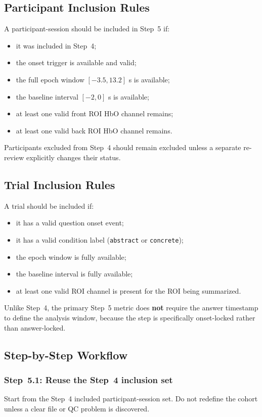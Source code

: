 \subsection{Participant Inclusion Rules}
A participant-session should be included in Step~5 if:
\begin{itemize}
    \item it was included in Step~4;
    \item the onset trigger is available and valid;
    \item the full epoch window \([-3.5, 13.2]\) s is available;
    \item the baseline interval \([-2, 0]\) s is available;
    \item at least one valid front ROI HbO channel remains;
    \item at least one valid back ROI HbO channel remains.
\end{itemize}

Participants excluded from Step~4 should remain excluded unless a separate re-review explicitly
changes their status.

\subsection{Trial Inclusion Rules}
A trial should be included if:
\begin{itemize}
    \item it has a valid question onset event;
    \item it has a valid condition label (\texttt{abstract} or \texttt{concrete});
    \item the epoch window is fully available;
    \item the baseline interval is fully available;
    \item at least one valid ROI channel is present for the ROI being summarized.
\end{itemize}

Unlike Step~4, the primary Step~5 metric does \textbf{not} require the answer timestamp to define
the analysis window, because the step is specifically onset-locked rather than answer-locked.

\subsection{Step-by-Step Workflow}

\subsubsection{Step~5.1: Reuse the Step~4 inclusion set}
Start from the Step~4 included participant-session set.
Do not redefine the cohort unless a clear file or QC problem is discovered.

